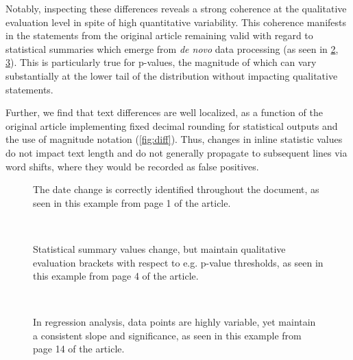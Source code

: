 Notably, inspecting these differences reveals a strong coherence at the qualitative evaluation level in spite of high quantitative variability.
This coherence manifests in the statements from the original article remaining valid with regard to statistical summaries which emerge from  \textit{de novo} data processing (as seen in \ref{fig:diff_text}, \ref{fig:diff_fig}).
This is particularly true for p-values, the magnitude of which can vary substantially at the lower tail of the distribution without impacting qualitative statements.


Further, we find that text differences are well localized, as a function of the original article implementing fixed decimal rounding for statistical outputs and the use of magnitude notation (\cref{fig:diff}).
Thus, changes in inline statistic values do not impact text length and do not generally propagate to subsequent lines via word shifts, where they would be recorded as false positives.

\begin{figure*}
	\centering
	\begin{subfigure}{0.99\textwidth}
		\centering
		\caption{
			The date change is correctly identified throughout the document, as seen in this example from page 1 of the article.
		}
		\label{fig:diff_date}
	\end{subfigure}
	\\
	\begin{subfigure}{0.99\textwidth}
		\centering
		\caption{
			Statistical summary values change, but maintain qualitative evaluation brackets with respect to e.g. p-value thresholds, as seen in this example from page 4 of the article.
		}
		\label{fig:diff_text}
	\end{subfigure}
	\\
	\vspace{1em}
	\begin{subfigure}{0.99\textwidth}
		\centering
		\caption{
			In regression analysis, data points are highly variable, yet maintain a consistent slope and significance, as seen in this example from page 14 of the article.
		}
		\label{fig:diff_fig}
	\end{subfigure}
	\caption{
		\textbf{The article difference showcases expected quantitative and metadata variability, while maintaining overall validity of qualitative statements.}
		The figures are extracted from a full article \texttt{diff}, with tinted highlighting (blue for the Historical Manuscript Record, and orange for the new reexecution system result).
	}
	\label{fig:diff}
\end{figure*}

